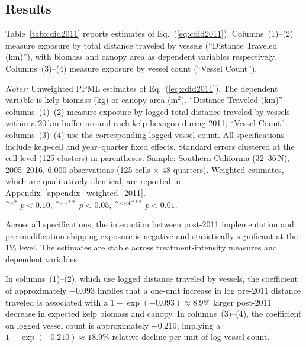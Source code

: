 \documentclass[12pt]{article}
\providecommand{\sym}[1]{\ifmmode^{#1}\else\(^{#1}\)\fi}
\begin{document}
\subsection{Results}

Table~\ref{tab:cdid2011} reports estimates of Eq.~(\ref{eq:cdid2011}). Columns~(1)--(2) measure exposure by total distance traveled by vessels (``Distance Traveled (km)''), with biomass and canopy area as dependent variables respectively. Columns~(3)--(4) measure exposure by vessel count (``Vessel Count'').

\begin{table}[H]
  \centering
  \caption{Continuous difference-in-differences: Kelp outcomes and the 2011 boundary modification}
  \label{tab:cdid2011}
  
  \vspace{0.5em}

  \begin{minipage}{\linewidth}
  \footnotesize
  \textit{Notes:} Unweighted PPML estimates of Eq.~(\ref{eq:cdid2011}). The dependent variable is kelp biomass (kg) or canopy area (m$^{2}$). ``Distance Traveled (km)'' columns~(1)--(2) measure exposure by logged total distance traveled by vessels within a 20\,km buffer around each kelp hexagon during 2011; ``Vessel Count'' columns~(3)--(4) use the corresponding logged vessel count. All specifications include kelp-cell and year--quarter fixed effects. Standard errors clustered at the cell level (125 clusters) in parentheses. Sample: Southern California (32\textdegree--36\textdegree\,N), 2005--2016, 6,000 observations (125 cells $\times$ 48 quarters). Weighted estimates, which are qualitatively identical, are reported in \hyperref[appendix_weighted_2011]{Appendix~\ref*{appendix_weighted_2011}}.\\
  \sym{*} \(p<0.10\), \sym{**} \(p<0.05\), \sym{***} \(p<0.01\).
  \end{minipage}
\end{table}

Across all specifications, the interaction between post-2011 implementation and pre-modification shipping exposure is negative and statistically significant at the 1\% level. The estimates are stable across treatment-intensity measures and dependent variables.

In columns~(1)--(2), which use logged distance traveled by vessels, the coefficient of approximately $-0.093$ implies that a one-unit increase in log pre-2011 distance traveled is associated with a $1-\exp(-0.093)\approx 8.9\%$ larger post-2011 decrease in expected kelp biomass and canopy. In columns~(3)--(4), the coefficient on logged vessel count is approximately $-0.210$, implying a $1-\exp(-0.210)\approx 18.9\%$ relative decline per unit of log vessel count.
\end{document}
